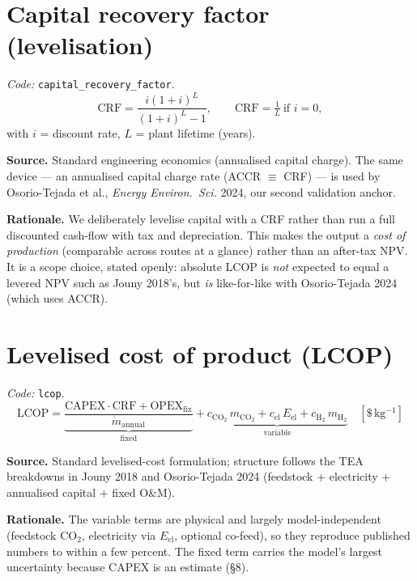 \documentclass[11pt,a4paper]{article}
\newcommand{\co}{\ensuremath{\mathrm{CO_2}}}
\newcommand{\kgi}{\mathrm{kg^{-1}}}
\begin{document}
\section{Capital recovery factor (levelisation)}
\emph{Code: }\texttt{capital\_recovery\_factor}.
\begin{equation}
\mathrm{CRF} = \frac{i(1+i)^{L}}{(1+i)^{L}-1}, \qquad
\mathrm{CRF} = \tfrac{1}{L}\ \text{if } i=0,
\end{equation}
with $i$ = discount rate, $L$ = plant lifetime (years).

\textbf{Source.} Standard engineering economics (annualised capital charge). The
same device --- an annualised capital charge rate (ACCR $\equiv$ CRF) --- is used
by Osorio-Tejada et al., \emph{Energy Environ.\ Sci.} 2024, our second validation
anchor.

\textbf{Rationale.} We deliberately levelise capital with a CRF rather than run a
full discounted cash-flow with tax and depreciation. This makes the output a
\emph{cost of production} (comparable across routes at a glance) rather than an
after-tax NPV. It is a scope choice, stated openly: absolute LCOP is \emph{not}
expected to equal a levered NPV such as Jouny 2018's, but \emph{is} like-for-like
with Osorio-Tejada 2024 (which uses ACCR).

\section{Levelised cost of product (LCOP)}
\emph{Code: }\texttt{lcop}.
\begin{equation}
\mathrm{LCOP} =
\underbrace{\frac{\mathrm{CAPEX}\cdot\mathrm{CRF} + \mathrm{OPEX}_\mathrm{fix}}
{\dot m_\mathrm{annual}}}_{\text{fixed}}
+ \underbrace{c_{\co}\,m_{\co} + c_\mathrm{el}\,E_\mathrm{el}
+ c_{\mathrm{H_2}}\,m_{\mathrm{H_2}}}_{\text{variable}}
\quad[\$\,\kgi]
\end{equation}

\textbf{Source.} Standard levelised-cost formulation; structure follows the TEA
breakdowns in Jouny 2018 and Osorio-Tejada 2024 (feedstock + electricity +
annualised capital + fixed O\&M).

\textbf{Rationale.} The variable terms are physical and largely model-independent
(feedstock \co, electricity via $E_\mathrm{el}$, optional  co-feed), so
they reproduce published numbers to within a few percent. The fixed term carries
the model's largest uncertainty because CAPEX is an estimate (\S8).
\end{document}
